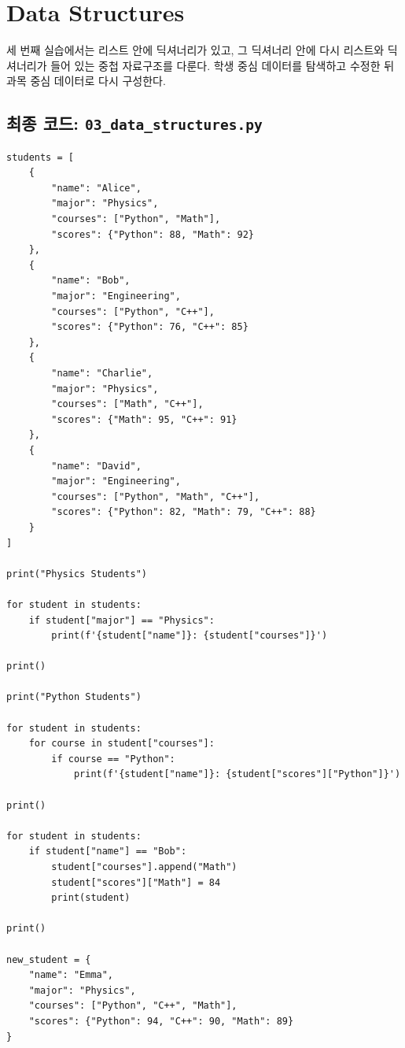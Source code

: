 \documentclass[11pt,a4paper]{article}
\begin{document}
\section{Data Structures}

세 번째 실습에서는 리스트 안에 딕셔너리가 있고, 그 딕셔너리 안에 다시 리스트와 딕셔너리가 들어 있는 중첩 자료구조를 다룬다.
학생 중심 데이터를 탐색하고 수정한 뒤 과목 중심 데이터로 다시 구성한다.

\subsection{최종 코드: \texttt{03\_data\_structures.py}}

\begin{lstlisting}
students = [
    {
        "name": "Alice",
        "major": "Physics",
        "courses": ["Python", "Math"],
        "scores": {"Python": 88, "Math": 92}
    },
    {
        "name": "Bob",
        "major": "Engineering",
        "courses": ["Python", "C++"],
        "scores": {"Python": 76, "C++": 85}
    },
    {
        "name": "Charlie",
        "major": "Physics",
        "courses": ["Math", "C++"],
        "scores": {"Math": 95, "C++": 91}
    },
    {
        "name": "David",
        "major": "Engineering",
        "courses": ["Python", "Math", "C++"],
        "scores": {"Python": 82, "Math": 79, "C++": 88}
    }
]

print("Physics Students")

for student in students:
    if student["major"] == "Physics":
        print(f'{student["name"]}: {student["courses"]}')

print()

print("Python Students")

for student in students:
    for course in student["courses"]:
        if course == "Python":
            print(f'{student["name"]}: {student["scores"]["Python"]}')

print()

for student in students:
    if student["name"] == "Bob":
        student["courses"].append("Math")
        student["scores"]["Math"] = 84
        print(student)

print()

new_student = {
    "name": "Emma",
    "major": "Physics",
    "courses": ["Python", "C++", "Math"],
    "scores": {"Python": 94, "C++": 90, "Math": 89}
}


\end{lstlisting}
\end{document}
